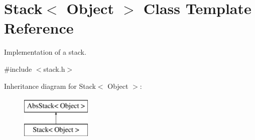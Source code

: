 \hypertarget{classStack}{}\section{Stack$<$ Object $>$ Class Template Reference}
\label{classStack}


Implementation of a stack.  




{\ttfamily \#include $<$stack.\+h$>$}

Inheritance diagram for Stack$<$ Object $>$\+:\begin{figure}[H]
\begin{center}
\leavevmode
\includegraphics[height=2.000000cm]{classStack}
\end{center}
\end{figure}

